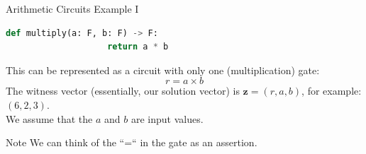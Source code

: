 \documentclass{zkdl-presentation-template}
\begin{document}
    \begin{frame}[fragile]{Arithmetic Circuits Example I}
        \begin{example}
            \begin{lstlisting}[language=Python, numbers=none, autogobble=true, xleftmargin=10pt]
                def multiply(a: F, b: F) -> F:
                    return a * b
            \end{lstlisting}
            \pause
            This can be represented as a circuit with only one (multiplication) gate:
            \begin{equation*}
                r = a \times b
            \end{equation*}    
            \pause
            The witness vector (essentially, our solution vector) is $\mathbf{z} = (r, a, b)$, for
            example: $(6, 2, 3)$. \\
            \vspace{5pt}
            We assume that the $a$ and $b$ are input values.
        \end{example}

        \pause

        \begin{remarkblock}{Note}
            We can think of the ``=`` in the gate as an assertion.
        \end{remarkblock}
    \end{frame}
\end{document}
